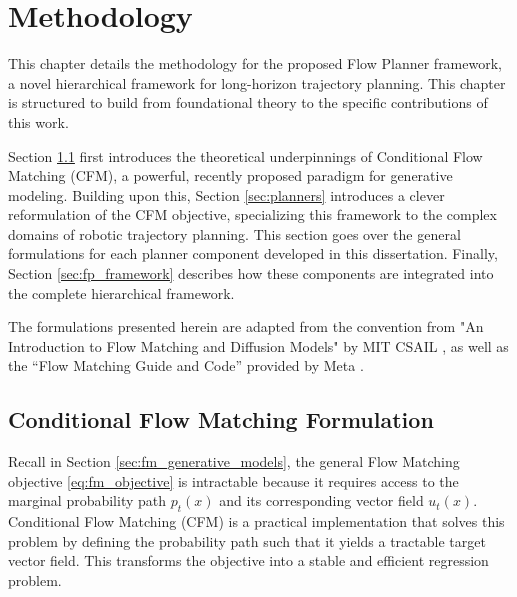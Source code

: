 \chapter{Methodology}
This chapter details the methodology for the proposed Flow Planner framework, a novel hierarchical framework for long-horizon trajectory planning. This chapter is structured to build from foundational theory to the specific contributions of this work.

Section \ref{sec:cfm_formulation} first introduces the theoretical underpinnings of Conditional Flow Matching (CFM), a powerful, recently proposed paradigm for generative modeling. Building upon this, Section \ref{sec:planners} introduces a clever reformulation of the CFM objective, specializing this framework to the complex domains of robotic trajectory planning. This section goes over the general formulations for each planner component developed in this dissertation. Finally, Section \ref{sec:fp_framework} describes how these components are integrated into the complete hierarchical framework. 

The formulations presented herein are adapted from the convention from "An Introduction to Flow Matching and Diffusion Models" by MIT CSAIL \cite{holderriethIntroductionFlowMatching2025}, as well as the “Flow Matching Guide and Code” provided by Meta \cite{lipmanFlowMatchingGuide2024a}.


\section{Conditional Flow Matching Formulation}
\label{sec:cfm_formulation}
Recall in Section \ref{sec:fm_generative_models}, the general Flow Matching objective \ref{eq:fm_objective} is intractable because it requires access to the marginal probability path $p_t(x)$ and its corresponding vector field $u_t(x)$. Conditional Flow Matching (CFM) is a practical implementation that solves this problem by defining the probability path such that it yields a tractable target vector field. This transforms the objective into a stable and efficient regression problem. 

